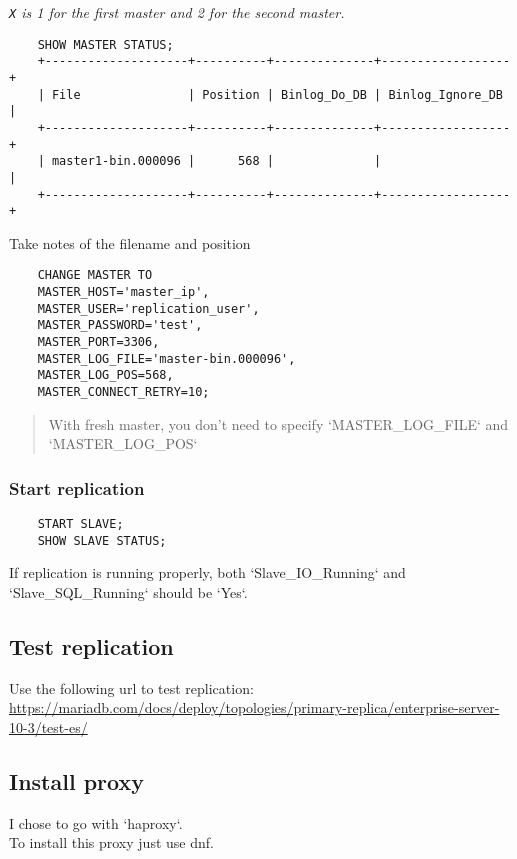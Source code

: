 \emph{\verb*|X| is 1 for the first master and 2 for the second master.}

\begin{lstlisting}
    SHOW MASTER STATUS;
    +--------------------+----------+--------------+------------------+
    | File               | Position | Binlog_Do_DB | Binlog_Ignore_DB |
    +--------------------+----------+--------------+------------------+
    | master1-bin.000096 |      568 |              |                  |
    +--------------------+----------+--------------+------------------+
\end{lstlisting}

Take notes of the filename and position

\begin{lstlisting}
    CHANGE MASTER TO
    MASTER_HOST='master_ip',
    MASTER_USER='replication_user',
    MASTER_PASSWORD='test',
    MASTER_PORT=3306,
    MASTER_LOG_FILE='master-bin.000096',
    MASTER_LOG_POS=568,
    MASTER_CONNECT_RETRY=10;
\end{lstlisting}

\begin{quote}
    With fresh master, you don't need to specify `MASTER\_LOG\_FILE` and `MASTER\_LOG\_POS`
\end{quote}

\subsubsection{Start replication}

\begin{lstlisting}
    START SLAVE;
    SHOW SLAVE STATUS;
\end{lstlisting}

If replication is running properly, both `Slave\_IO\_Running` and `Slave\_SQL\_Running` should be `Yes`.


\subsection{Test replication}

Use the following url to test replication: \url{https://mariadb.com/docs/deploy/topologies/primary-replica/enterprise-server-10-3/test-es/}

\subsection{Install proxy}

I chose to go with `haproxy`.\\
To install this proxy just use dnf.

